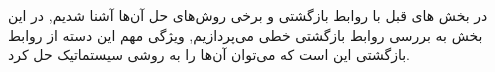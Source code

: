 در بخش های قبل با روابط بازگشتی و برخی روش‌های حل آن‌ها آشنا شدیم, در این بخش به بررسی روابط بازگشتی خطی می‌پردازیم,
ویژگی مهم این دسته از روابط بازگشتی این است 
که می‌توان آن‌ها را به روشی سیستماتیک حل کرد.



